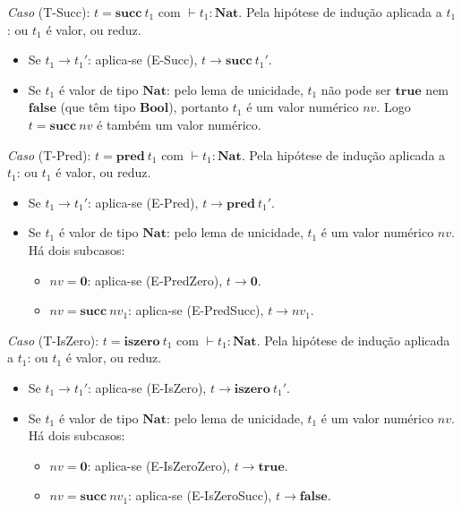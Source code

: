 \emph{Caso} (T-Succ): \(t = \mathbf{succ}\ t_1\) com \(\vdash t_1 :
\mathbf{Nat}\). Pela hipótese de indução aplicada a \(t_1\): ou
\(t_1\) é valor, ou reduz.

\begin{itemize}
  \item Se \(t_1 \to t_1'\): aplica-se (E-Succ), \(t \to \mathbf{succ}\ t_1'\).
  \item Se \(t_1\) é valor de tipo \(\mathbf{Nat}\): pelo lema de
    unicidade, \(t_1\) não pode ser \(\mathbf{true}\) nem
    \(\mathbf{false}\) (que têm tipo \(\mathbf{Bool}\)), portanto
    \(t_1\) é um valor numérico \(nv\). Logo \(t =
    \mathbf{succ}\ nv\) é também um valor numérico.
\end{itemize}

\emph{Caso} (T-Pred): \(t = \mathbf{pred}\ t_1\) com \(\vdash t_1 :
\mathbf{Nat}\). Pela hipótese de indução aplicada a \(t_1\): ou
\(t_1\) é valor, ou reduz.

\begin{itemize}
  \item Se \(t_1 \to t_1'\): aplica-se (E-Pred), \(t \to \mathbf{pred}\ t_1'\).
  \item Se \(t_1\) é valor de tipo \(\mathbf{Nat}\): pelo lema de
    unicidade, \(t_1\) é um valor numérico \(nv\). Há dois subcasos:
    \begin{itemize}
      \item \(nv = \mathbf{0}\): aplica-se (E-PredZero), \(t \to \mathbf{0}\).
      \item \(nv = \mathbf{succ}\ nv_1\): aplica-se (E-PredSucc), \(t
        \to nv_1\).
    \end{itemize}
\end{itemize}

\emph{Caso} (T-IsZero): \(t = \mathbf{iszero}\ t_1\) com \(\vdash t_1
: \mathbf{Nat}\). Pela hipótese de indução aplicada a \(t_1\): ou
\(t_1\) é valor, ou reduz.
\begin{itemize}
  \item Se \(t_1 \to t_1'\): aplica-se (E-IsZero), \(t \to
    \mathbf{iszero}\ t_1'\).
  \item Se \(t_1\) é valor de tipo \(\mathbf{Nat}\): pelo lema de
    unicidade, \(t_1\) é um valor numérico \(nv\). Há dois subcasos:
    \begin{itemize}
      \item \(nv = \mathbf{0}\): aplica-se (E-IsZeroZero), \(t \to
        \mathbf{true}\).
      \item \(nv = \mathbf{succ}\ nv_1\): aplica-se (E-IsZeroSucc), \(t
        \to \mathbf{false}\).
    \end{itemize}
\end{itemize}

